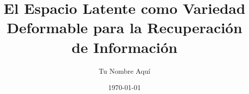 \documentclass[12pt, a4paper]{article}
\title{El Espacio Latente como Variedad Deformable para la Recuperación de Información}
\author{Tu Nombre Aquí}
\date{\today}
\begin{document}
\maketitle

\begin{abstract}
    
\end{abstract}

\tableofcontents
\newpage











\appendix

\end{document}
